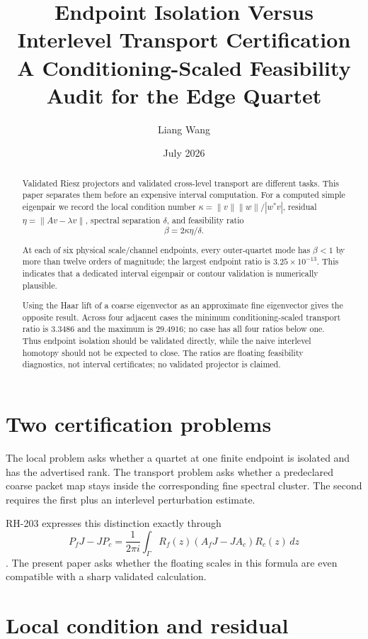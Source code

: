 \documentclass[12pt]{article}
\title{Endpoint Isolation Versus Interlevel Transport Certification\\
\large A Conditioning-Scaled Feasibility Audit for the Edge Quartet}
\author{Liang Wang}\date{July 2026}
\theoremstyle{remark}\newtheorem{remark}[theorem]{Remark}
\begin{document}
\maketitle
\begin{abstract}
Validated Riesz projectors and validated cross-level transport are different
tasks.  This paper separates them before an expensive interval computation.
For a computed simple eigenpair we record the local condition number
$\kappa=\|v\|\|w\|/|w^*v|$, residual $\eta=\|Av-\lambda v\|$, spectral
separation $\delta$, and feasibility ratio
\[
 \beta=2\kappa\eta/\delta.
\]

At each of six physical scale/channel endpoints, every outer-quartet mode
has $\beta<1$ by more than twelve orders of magnitude; the largest endpoint
ratio is $3.25\times10^{-13}$.  This indicates that a dedicated interval
eigenpair or contour validation is numerically plausible.

Using the Haar lift of a coarse eigenvector as an approximate fine
eigenvector gives the opposite result.  Across four adjacent cases the
minimum conditioning-scaled transport ratio is $3.3486$ and the maximum is
$29.4916$; no case has all four ratios below one.  Thus endpoint isolation
should be validated directly, while the naive interlevel homotopy should not
be expected to close.  The ratios are floating feasibility diagnostics, not
interval certificates; no validated projector is claimed.
\end{abstract}

\section{Two certification problems}

The local problem asks whether a quartet at one finite endpoint is isolated
and has the advertised rank.  The transport problem asks whether a
predeclared coarse packet map stays inside the corresponding fine spectral
cluster.  The second requires the first plus an interlevel perturbation
estimate.

RH-203 expresses this distinction exactly through
\begin{equation}\label{eq:riesz-transport}
 P_fJ-JP_c=\frac{1}{2\pi i}\int_\Gamma
 R_f(z)(A_fJ-JA_c)R_c(z)\,dz
\end{equation}
\citep{WangRH203}.  The present paper asks whether the floating scales in
this formula are even compatible with a sharp validated calculation.

\section{Local condition and residual}
\end{document}

